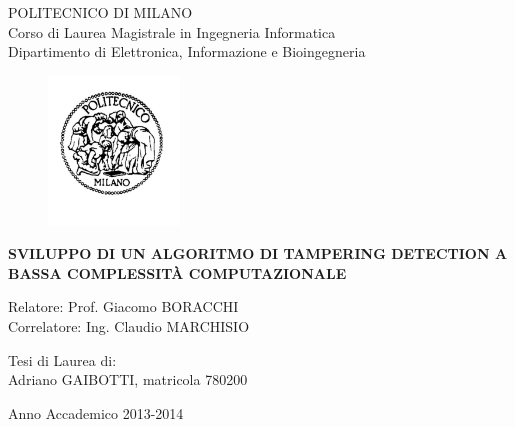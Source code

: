\thispagestyle{empty}
\vspace*{-1.5cm} \bfseries{
\begin{center}
  \large
  POLITECNICO DI MILANO\\
  \normalsize
  Corso di Laurea Magistrale in Ingegneria Informatica\\
  Dipartimento di Elettronica, Informazione e Bioingegneria\\
  \begin{figure}[htbp]
    \begin{center}
      \includegraphics[width=3.5cm]{./pictures/logopm}
    \end{center}
  \end{figure}
  \vspace*{0.3cm} \LARGE



  \textbf{SVILUPPO DI UN ALGORITMO DI TAMPERING DETECTION A BASSA COMPLESSIT\`A COMPUTAZIONALE}\\



\end{center}
\vspace*{3.0cm} \large
\begin{flushleft}


	Relatore: Prof. Giacomo BORACCHI \\
	Correlatore: Ing. Claudio MARCHISIO\\

  

\end{flushleft}
\vspace*{1.0cm}
\begin{flushright}


  Tesi di Laurea di:\\ Adriano GAIBOTTI, matricola 780200 \\ 
		       


\end{flushright}
\vspace*{0.5cm}
\begin{center}



  Anno Accademico 2013-2014
\end{center} \clearpage
}
